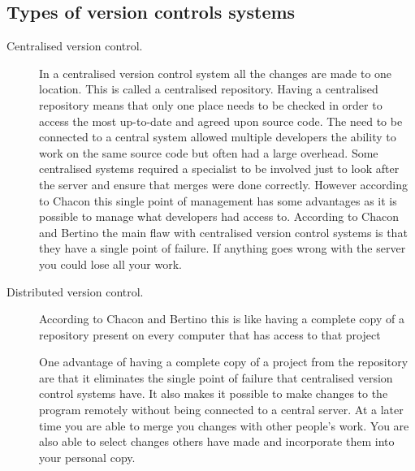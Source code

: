 \subsection{Types of version controls systems}
\begin{description}

  \item [Centralised version control.] 
  In a centralised version control system all the changes are made to one location.
  This is called a centralised repository.
  Having a centralised repository means that only one place needs to be checked in order to access the most up-to-date and agreed upon source code.
  The need to be connected to a central system allowed multiple developers the ability to work on the same source code but often had a large overhead.
  Some centralised systems required a specialist to be involved just to look after the server and ensure that merges were done correctly.
  However according to Chacon \cite{Chacon2009} this single point of management has some advantages as it is possible to manage what developers had access to. 
  According to Chacon \cite{Chacon2009} and Bertino \cite{Bertino2012} the main flaw with centralised version control systems is that they have a single point of failure.
  If anything goes wrong with the server you could lose all your work.

  \item [Distributed version control.] 
  According to Chacon \cite{Chacon2009} and Bertino \cite{Bertino2012} this is like having a complete copy of a repository present on every computer that has access to that project

  One advantage of having a complete copy of a project from the repository are that it eliminates the single point of failure that centralised version control systems have.
  It also makes it possible to make changes to the program remotely without being connected to a central server.
  At a later time you are able to merge you changes with other people's work.  
  You are also able to select changes others have made and incorporate them into your personal copy.


\end{description}
